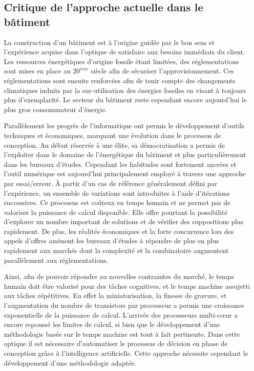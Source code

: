 \subsection{Critique de l’approche actuelle dans le bâtiment} %
\label{sub:critique_de_l_approche_actuelle_dans_le_batiment}
La construction d’un bâtiment est à l’origine guidée par le bon sens et l’expérience
acquise dans l’optique de satisfaire aux besoins immédiats du client.
Les ressources énergétiques d’origine fossile étant limitées, des
réglementations sont mises en place au $20^{ème}$ siècle afin de sécuriser
l’approvisionnement. Ces réglementations sont ensuite renforcées afin de tenir
compte des changements climatiques induits par la sur-utilisation des énergies
fossiles en visant à toujours plus d’exemplarité. Le secteur du bâtiment reste
cependant encore aujourd’hui le plus gros consommateur d’énergie.

Parallèlement les progrès de l’informatique ont permis le développement d’outils
techniques et économiques, marquant une évolution dans le processus de conception.
Au début réservée à une élite, sa démocratisation a permis de l’exploiter dans le domaine de
l’énergétique du bâtiment et plus particulièrement dans les bureaux d’études. Cependant
les habitudes sont fortement ancrées et l’outil numérique est aujourd’hui principalement
employé à travers une approche par essai/erreur. À partir d’un cas de référence
généralement défini par l’expérience, un ensemble de variations sont introduites à l’aide
d’itérations successives. Ce processus est coûteux en temps humain et ne permet pas de
valoriser la puissance de calcul disponible. Elle offre pourtant la possibilité d’explorer
un nombre important de solutions et de vérifier des suppositions plus rapidement. De plus,
les réalités économiques et la forte concurrence lors des appels d’offres amènent les
bureaux d’études à répondre de plus en plus rapidement aux marchés dont la complexité et
la combinatoire augmentent parallèlement aux réglementations.

Ainsi, afin de pouvoir répondre au nouvelles contraintes du marché, le temps humain doit
être valorisé pour des tâches cognitives, et le temps machine assujetti aux tâches
répétitives. En effet la miniaturisation, la finesse de gravure, et l’augmentation du
nombre de transistors par processeur a permis une croissance exponentielle de la puissance
de calcul. L’arrivée des processeurs multi-cœur a encore repoussé les limites de calcul,
si bien que le développement d’une méthodologie basée sur le temps machine est tout à fait
pertinente. Dans cette optique il est nécessaire d’automatiser le processus de décision en
phase de conception grâce à l’intelligence artificielle. Cette approche nécessite cependant
le développement d’une méthodologie adaptée.


